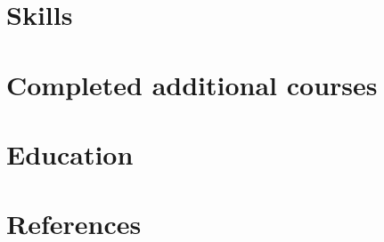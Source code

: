 \documentclass[letter,10pt]{article}
\begin{document}


%

\section{Skills}


\section{Completed additional courses}


\section{Education}



%

\section{References}

\end{document}

